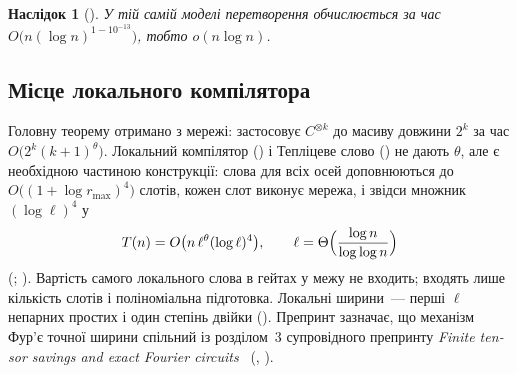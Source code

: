 \documentclass[11pt]{article}
\theoremstyle{plain}
\newtheorem{corollary}{Наслідок}
\newcommand{\en}[1]{\foreignlanguage{english}{#1}}
\begin{document}
\begin{corollary}[{\citep[Corollary~]{openai2026}}]\label{cor:decimal}
У тій самій моделі перетворення обчислюється за час $O\bigl(n(\log n)^{1-10^{-13}}\bigr)$, тобто $o(n\log n)$.
\end{corollary}

\subsection{Місце локального компілятора}\label{sec:role}
Головну теорему отримано з мережі:  застосовує $C^{\otimes k}$ до масиву довжини $2^k$ за час $O\bigl(2^k(k+1)^{\theta}\bigr)$. Локальний компілятор () і Тепліцеве слово () не дають $\theta$, але є необхідною частиною конструкції: слова для всіх осей доповнюються до $O\bigl((1+\log r_{\max})^4\bigr)$ слотів, кожен слот виконує мережа, і звідси множник $(\log\ell)^4$ у
\begin{equation}\label{eq:Tn}
T(n)=O\bigl(n\,\ell^{\theta}(\log\ell)^4\bigr),\qquad \ell=\Theta\Bigl(\frac{\log n}{\log\log n}\Bigr)
\end{equation}
(; ). Вартість самого локального слова в гейтах у межу не входить; входять лише кількість слотів і поліноміальна підготовка. Локальні ширини~--- перші $\ell$ непарних простих і один степінь двійки (). Препринт зазначає, що механізм Фур'є точної ширини спільний із розділом~3 супровідного препринту \emph{\en{Finite tensor savings and exact Fourier circuits}}~\citep{openai2026companion} (, ).
\end{document}

